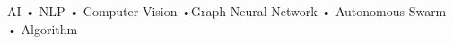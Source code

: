 
\begin{cventries}
  \cventry
    {AI \hspace{0.4em}•\hspace{0.4em}  NLP  \hspace{0.4em}•\hspace{0.4em}  Computer Vision  \hspace{0.4em}•\hspace {0.4em}Graph Neural Network \hspace{0.4em}•\hspace{0.4em} Autonomous Swarm \hspace{0.4em}•\hspace{0.4em}  Algorithm}
    {} %
    {} %
    {} %
    {} %
\end{cventries}
\vspace{-\baselineskip} %










